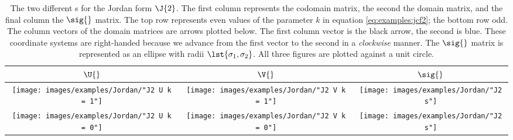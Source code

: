 \clearpage
\thispagestyle{empty}
\begin{landscape}
\begin{table}[htdp]
\caption[The two different \asvd s for the Jordan form $\J{2}$]{The two different \asvd s for the Jordan form $\J{2}$. The first column represents the codomain matrix, the second the domain matrix, and the final column the $\sig{}$ matrix. The top row represents even values of the parameter $k$ in equation \eqref{eq:examples:jcf2}; the bottom row odd. The column vectors of the domain matrices are arrows plotted below. The first column vector is the black arrow, the second is blue. These coordinate systems are right-handed because we advance from the first vector to the second in a \emph{clockwise} manner. The $\sig{}$ matrix is represented as an ellipse with radii $\lst{\sigma_{1}, \sigma_{2}}$. All three figures are plotted against a unit circle.}
\begin{center}
\begin{tabular}{ccc}
%
  $\U{}$ & \quad $\V{}$ & \quad $\sig{}$ \\[10pt]\hline
%
\texttt{[image: images/examples/Jordan/"J2 U k = 1"]} & \quad
\texttt{[image: images/examples/Jordan/"J2 V k = 1"]} & \quad
\texttt{[image: images/examples/Jordan/"J2 s"]} \\[10pt]
%
\texttt{[image: images/examples/Jordan/"J2 U k = 0"]} & \quad
\texttt{[image: images/examples/Jordan/"J2 V k = 0"]} & \quad
\texttt{[image: images/examples/Jordan/"J2 s"]} \\
%
\end{tabular}
\end{center}
\label{tab:J2:k}
\end{table}
\end{landscape}


\endinput
